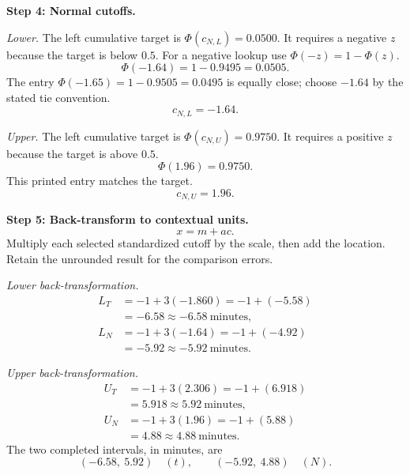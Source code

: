 \begin{enumerate}[leftmargin=*,label=\textbf{\arabic*.},itemsep=12pt,parsep=3pt,topsep=5pt]
\begin{minipage}{\linewidth}
\end{minipage}\par
\par\textbf{Step 4: Normal cutoffs.}\nopagebreak\enspace \par\noindent\begin{minipage}{\linewidth}
\par\textit{Lower.} The left cumulative target is $\Phi(c_{N,L})=0.0500$. It requires a negative $z$ because the target is below $0.5$. For a negative lookup use $\Phi(-z)=1-\Phi(z)$.\[
\Phi(-1.64)=1-0.9495=0.0505.
\]
The entry $\Phi(-1.65)=1-0.9505=0.0495$ is equally close; choose $-1.64$ by the stated tie convention.\[
c_{N,L}=-1.64.
\]
\end{minipage}\par
\par\noindent\begin{minipage}{\linewidth}
\par\textit{Upper.} The left cumulative target is $\Phi(c_{N,U})=0.9750$. It requires a positive $z$ because the target is above $0.5$.\[
\Phi(1.96)=0.9750.
\]
This printed entry matches the target.\[
c_{N,U}=1.96.
\]
\end{minipage}\par

\par\noindent\begin{minipage}{\linewidth}
\par\textbf{Step 5: Back-transform to contextual units.}\nopagebreak\enspace \[
x=m+ac.
\]
Multiply each selected standardized cutoff by the scale, then add the location. Retain the unrounded result for the comparison errors.
\par\textit{Lower back-transformation.}
\[
\begin{aligned}L_T&=-1+3(-1.860)=-1+(-5.58)\\&=-6.58\approx\boxed{-6.58\ \text{minutes}},\\L_N&=-1+3(-1.64)=-1+(-4.92)\\&=-5.92\approx\boxed{-5.92\ \text{minutes}}.\end{aligned}
\]
\par\textit{Upper back-transformation.}
\[
\begin{aligned}U_T&=-1+3(2.306)=-1+(6.918)\\&=5.918\approx\boxed{5.92\ \text{minutes}},\\U_N&=-1+3(1.96)=-1+(5.88)\\&=4.88\approx\boxed{4.88\ \text{minutes}}.\end{aligned}
\]
The two completed intervals, in minutes, are
\[
\boxed{(-6.58,\ 5.92)\quad(t)},\qquad\boxed{(-5.92,\ 4.88)\quad(N)}.
\]


\end{minipage}
\end{enumerate}
